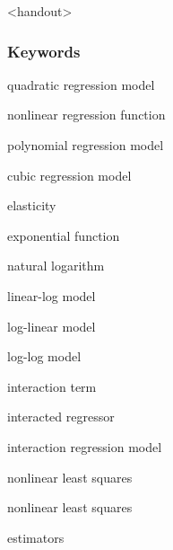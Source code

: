 

\begin{frame}<handout>
\frametitle{Keywords}
\begin{iteminline}
\item quadratic regression model 
\item nonlinear regression function
\item polynomial regression model
\item cubic regression model
\item elasticity
\item exponential function 
\item natural logarithm 
\item linear-log model
\item log-linear model
\item log-log model
\item interaction term
\item interacted regressor 
\item interaction regression model
\item nonlinear least squares
\item nonlinear least squares
\item estimators
\end{iteminline}
\end{frame}



